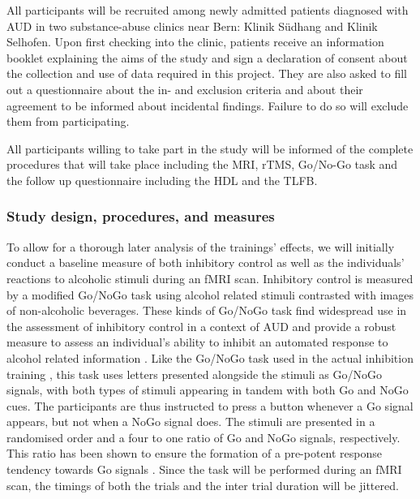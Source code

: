 \documentclass[12pt]{article}
\begin{document}
All participants will be recruited among newly admitted patients diagnosed with AUD in two substance-abuse clinics near Bern: Klinik Südhang and Klinik Selhofen. Upon first checking into the clinic, patients receive an information booklet explaining the aims of the study and sign a declaration of consent about the collection and use of data required in this project. They are also asked to fill out a questionnaire about the in- and exclusion criteria and about their agreement to be informed about incidental findings. Failure to do so will exclude them from participating.

All participants willing to take part in the study will be informed of the complete procedures that will take place including the MRI, rTMS, Go/No-Go task and the follow up questionnaire including the HDL and the TLFB.

\subsubsection{Study design, procedures, and measures}

To allow for a thorough later analysis of the trainings' effects, we will initially conduct a baseline measure of both inhibitory control as well as the individuals' reactions to alcoholic stimuli during an fMRI scan. Inhibitory control is measured by a modified Go/NoGo task using alcohol related stimuli contrasted with images of non-alcoholic beverages. These kinds of Go/NoGo task find widespread use in the assessment of inhibitory control in a context of AUD and provide a robust measure to assess an individual's ability to inhibit an automated response to alcohol related information \parencite{amesNeuralCorrelatesGo2014,bowleyEffectsInhibitoryControl2013,roseEffectsAlcoholInhibitory2008,simmondsMetaanalysisGoNogo2008}. Like the Go/NoGo task used in the actual inhibition training \parencite{houbenBeerNogoLearning2012}, this task uses letters presented alongside the stimuli as Go/NoGo signals, with both types of stimuli appearing in tandem with both Go and NoGo cues. The participants are thus instructed to press a button whenever a Go signal appears, but not when a NoGo signal does. The stimuli are presented in a randomised order and a four to one ratio of Go and NoGo signals, respectively. This ratio has been shown to ensure the formation of a pre-potent response tendency towards Go signals \parencite{amesNeuralCorrelatesGo2014}. Since the task will be performed during an fMRI scan, the timings of both the trials and the inter trial duration will be jittered.
\end{document}
